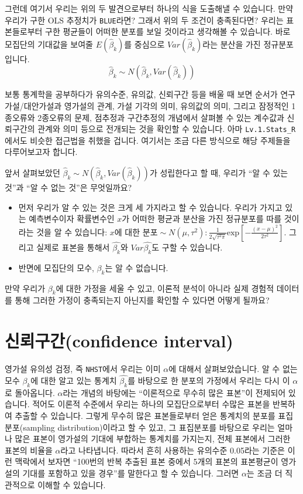 \documentclass[
]{book}
\begin{document}
그런데 여기서 우리는 위의 두 발견으로부터 하나의 식을 도출해낼 수 있습니다. 만약 우리가 구한 OLS 추정치가 \texttt{BLUE}라면? 그래서 위의 두 조건이 충족된다면? 우리는 표본들로부터 구한 평균들이 어떠한 분포를 보일 것이라고 생각해볼 수 있습니다. 바로 모집단의 기대값을 보여줄 \(E(\hat{\beta}_k)\)를 중심으로 \(Var(\hat{\beta}_k)\)라는 분산을 가진 정규분포입니다.
\[
\hat{\beta}_k \sim N(\hat{\beta}_k, Var(\hat{\beta}_k))
\]

보통 통계학을 공부하다가 유의수준, 유의값, 신뢰구간 등을 배울 때 보면 순서가 연구가설/대안가설과 영가설의 관계, 가설 기각의 의미, 유의값의 의미, 그리고 잠정적인 1종오류와 2종오류의 문제, 점추정과 구간추정의 개념에서 살펴볼 수 있는 계수값과 신뢰구간의 관계와 의미 등으로 전개되는 것을 확인할 수 있습니다. 아마 \texttt{Lv.1.Stats\_R}에서도 비슷한 접근법을 취했을 겁니다. 여기서는 조금 다른 방식으로 해당 주제들을 다루어보고자 합니다.

앞서 살펴보았던 \(\hat{\beta}_k \sim N(\hat{\beta}_k, Var(\hat{\beta}_k))\)가 성립한다고 할 때, 우리가 ``알 수 있는 것''과 ``알 수 없는 것''은 무엇일까요?

\begin{itemize}
\item
  먼저 우리가 알 수 있는 것은 크게 세 가지라고 할 수 있습니다. 우리가 가지고 있는 예측변수이자 확률변수인 \(x\)가 어떠한 평균과 분산을 가진 정규분포를 따를 것이라는 것을 알 수 있습니다: \(x\text{에 대한 분포} \sim N(\mu, \tau^2): \frac{1}{2\sqrt{\tau^2\pi}}\text{exp}[-\frac{(x-\mu)^2}{2\tau^2}]\). 그리고 실제로 표본을 통해서 \(\hat{\beta_k}\)와 \(Var{\hat{\beta_k}}\)도 구할 수 있습니다.
\item
  반면에 모집단의 모수, \(\beta_k\)는 알 수 없습니다.
\end{itemize}

만약 우리가 \(\beta_k\)에 대한 가정을 세울 수 있고, 이론적 분석이 아니라 실제 경험적 데이터를 통해 그러한 가정이 충족되는지 아닌지를 확인할 수 있다면 어떻게 될까요?

\hypertarget{uxc2e0uxb8b0uxad6cuxac04confidence-interval}{%
\section{신뢰구간(confidence interval)}\label{uxc2e0uxb8b0uxad6cuxac04confidence-interval}}

영가설 유의성 검정, 즉 \texttt{NHST}에서 우리는 이미 \(\alpha\)에 대해서 살펴보았습니다. 알 수 없는 모수 \(\beta_k\)에 대한 알고 있는 통계치 \(\hat{\beta_k}\)를 바탕으로 한 분포의 가정에서 우리는 다시 이 \(\alpha\)로 돌아옵니다. \(\alpha\)라는 개념의 바탕에는 ``이론적으로 무수히 많은 표본''이 전제되어 있습니다. 적어도 이론적 수준에서 우리는 하나의 모집단으로부터 수많은 표본을 반복하여 추출할 수 있습니다. 그렇게 무수히 많은 표본들로부터 얻은 통계치의 분포를 표집분포(sampling distribution)이라고 할 수 있고, 그 표집분포를 바탕으로 우리는 얼마나 많은 표본이 영가설의 기대에 부합하는 통계치를 가지는지, 전체 표본에서 그러한 표본의 비율을 \(\alpha\)라고 나타냅니다. 따라서 흔히 사용하는 유의수준 0.05라는 기준은 이런 맥락에서 보자면 ``100번의 반복 추출된 표본 중에서 5개의 표본의 표본평균이 영가설의 기대를 포함하고 있을 경우''를 말한다고 할 수 있습니다. 그러면 \(\alpha\)는 조금 더 직관적으로 이해할 수 있습니다.
\end{document}
